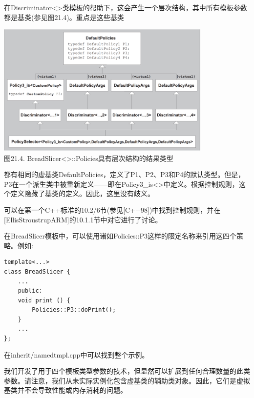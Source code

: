 在Discriminator<>类模板的帮助下，这会产生一个层次结构，其中所有模板参数都是基类(参见图21.4)。重点是这些基类

\begin{center}
\includegraphics[width=0.8\textwidth]{content/3/chapter21/images/4.png} \\
图21.4. BreadSlicer<>::Policies具有层次结构的结果类型
\end{center}

都有相同的虚基类DefaultPolicies，定义了P1、P2、P3和P4的默认类型。但是，P3在一个派生类中被重新定义——即在Policy3\_is<>中定义。根据控制规则，这个定义隐藏了基类的定义。因此，这里没有歧义。

\begin{tcolorbox}[colback=webgreen!5!white,colframe=webgreen!75!black]
\hspace*{0.75cm}可以在第一个C++标准的10.2/6节(参见[C++98])中找到控制规则，并在[EllisStroustrupARM]的10.1.1节中对它进行了讨论。
\end{tcolorbox}

在BreadSlicer模板中，可以使用诸如Policies::P3这样的限定名称来引用这四个策略。例如:

\begin{lstlisting}[style=styleCXX]
template<...>
class BreadSlicer {
	...
	public:
	void print () {
		Policies::P3::doPrint();
	}
	...
};
\end{lstlisting}

在inherit/namedtmpl.cpp中可以找到整个示例。

我们开发了用于四个模板类型参数的技术，但显然可以扩展到任何合理数量的此类参数。请注意，我们从未实际实例化包含虚基类的辅助类对象。因此，它们是虚拟基类并不会导致性能或内存消耗的问题。






